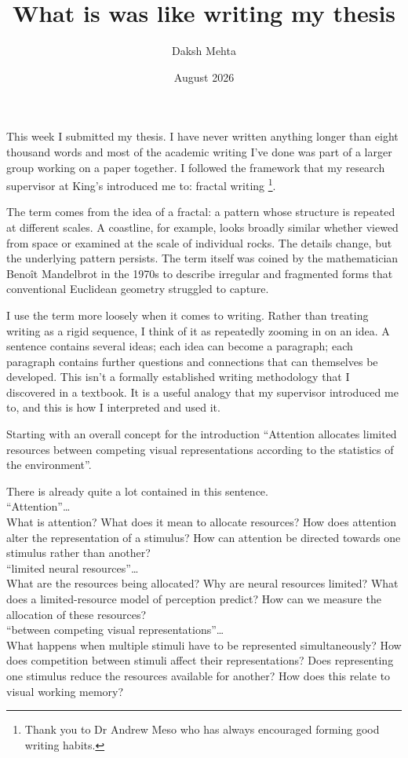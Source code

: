 \documentclass{article}
\title{What is was like writing my thesis}
\date{August 2026}
\author{Daksh Mehta}
\begin{document}
This week I submitted my thesis. I have never written anything longer than eight thousand words and most of the academic writing I've done was part of a larger group working on a paper together. I followed the framework that my research supervisor at King's introduced me to: fractal writing \footnote{Thank you to Dr Andrew Meso who has always encouraged forming good writing habits.}.  

The term comes from the idea of a fractal: a pattern whose structure is repeated at different scales. A coastline, for example, looks broadly similar whether viewed from space or examined at the scale of individual rocks. The details change, but the underlying pattern persists. The term itself was coined by the mathematician Benoît Mandelbrot in the 1970s to describe irregular and fragmented forms that conventional Euclidean geometry struggled to capture.

I use the term more loosely when it comes to writing. Rather than treating writing as a rigid sequence, I think of it as repeatedly zooming in on an idea. A sentence contains several ideas; each idea can become a paragraph; each paragraph contains further questions and connections that can themselves be developed. This isn’t a formally established writing methodology that I discovered in a textbook. It is a useful analogy that my supervisor introduced me to, and this is how I interpreted and used it.

Starting with an overall concept for the introduction ``Attention allocates limited resources between competing visual representations according to the statistics of the environment''.

There is already quite a lot contained in this sentence.\\

``Attention''\ldots
\\
What is attention?
What does it mean to allocate resources?
How does attention alter the representation of a stimulus?
How can attention be directed towards one stimulus rather than another?
\\

``limited neural resources''\ldots
\\
What are the resources being allocated?
Why are neural resources limited?
What does a limited-resource model of perception predict?
How can we measure the allocation of these resources?
\\

``between competing visual representations''\ldots
\\
What happens when multiple stimuli have to be represented simultaneously?
How does competition between stimuli affect their representations?
Does representing one stimulus reduce the resources available for another?
How does this relate to visual working memory?
\\
\end{document}
